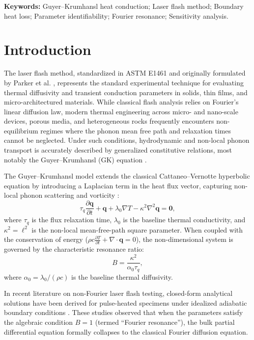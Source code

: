 \documentclass[review,12pt]{article}
\begin{document}
\textbf{Keywords:} Guyer--Krumhansl heat conduction; Laser flash method; Boundary heat loss; Parameter identifiability; Fourier resonance; Sensitivity analysis.

\newpage

\section{Introduction}

The laser flash method, standardized in ASTM E1461 \cite{astm2013standard} and originally formulated by Parker et al. \cite{parker1961flash}, represents the standard experimental technique for evaluating thermal diffusivity and transient conduction parameters in solids, thin films, and micro-architectured materials. While classical flash analysis relies on Fourier's linear diffusion law, modern thermal engineering across micro- and nano-scale devices, porous media, and heterogeneous rocks frequently encounters non-equilibrium regimes where the phonon mean free path and relaxation times cannot be neglected. Under such conditions, hydrodynamic and non-local phonon transport is accurately described by generalized constitutive relations, most notably the Guyer--Krumhansl (GK) equation \cite{guyer1966solution,guyer1966thermal,kovacs2018analytic,sellitto2025nonlinear}.

The Guyer--Krumhansl model extends the classical Cattaneo--Vernotte hyperbolic equation by introducing a Laplacian term in the heat flux vector, capturing non-local phonon scattering and vorticity \cite{van2017galilean,zhu2017nonlocal}:
\begin{equation}
\tau_q \frac{\partial \bm{q}}{\partial t} + \bm{q} + \lambda_0 \nabla T - \kappa^2 \nabla^2 \bm{q} = \bm{0},
\label{eq:gk_dimensional}
\end{equation}
where $\tau_q$ is the flux relaxation time, $\lambda_0$ is the baseline thermal conductivity, and $\kappa^2 = \ell^2$ is the non-local mean-free-path square parameter. When coupled with the conservation of energy ($\rho c \frac{\partial T}{\partial t} + \nabla \cdot \bm{q} = 0$), the non-dimensional system is governed by the characteristic resonance ratio:
\begin{equation}
B = \frac{\kappa^2}{\alpha_0 \tau_q},
\label{eq:B_ratio}
\end{equation}
where $\alpha_0 = \lambda_0 / (\rho c)$ is the baseline thermal diffusivity.

In recent literature on non-Fourier laser flash testing, closed-form analytical solutions have been derived for pulse-heated specimens under idealized adiabatic boundary conditions \cite{kovacs2018analytic,both2016deviation}. These studies observed that when the parameters satisfy the algebraic condition $B = 1$ (termed ``Fourier resonance''), the bulk partial differential equation formally collapses to the classical Fourier diffusion equation. 
\end{document}
